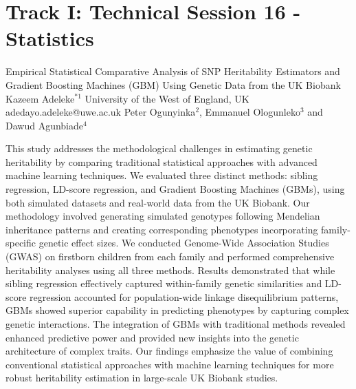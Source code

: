 \section{Track I: Technical Session 16 - Statistics}\newpage

\begin{talk}
  {Empirical Statistical Comparative Analysis of SNP Heritability Estimators and Gradient Boosting Machines (GBM) Using Genetic Data from the UK Biobank}%
  {Kazeem Adeleke$^{*1}$} %
  {University of the West of England, UK}%
  {adedayo.adeleke@uwe.ac.uk} %
  { Peter Ogunyinka$^{2}$, Emmanuel Ologunleko$^{3}$ and Dawud Agunbiade$^{4}$} %
  
    
   
This study addresses the methodological challenges in estimating genetic heritability by comparing traditional statistical approaches with advanced machine learning techniques. We evaluated three distinct methods: sibling regression, LD-score regression, and Gradient Boosting Machines (GBMs), using both simulated datasets and real-world data from the UK Biobank. Our methodology involved generating simulated genotypes following Mendelian inheritance patterns and creating corresponding phenotypes incorporating family-specific genetic effect sizes. We conducted Genome-Wide Association Studies (GWAS) on firstborn children from each family and performed comprehensive heritability analyses using all three methods. Results demonstrated that while sibling regression effectively captured within-family genetic similarities and LD-score regression accounted for population-wide linkage disequilibrium patterns, GBMs showed superior capability in predicting phenotypes by capturing complex genetic interactions. The integration of GBMs with traditional methods revealed enhanced predictive power and provided new insights into the genetic architecture of complex traits. Our findings emphasize the value of combining conventional statistical approaches with machine learning techniques for more robust heritability estimation in large-scale UK Biobank studies.

\medskip


\end{talk}

